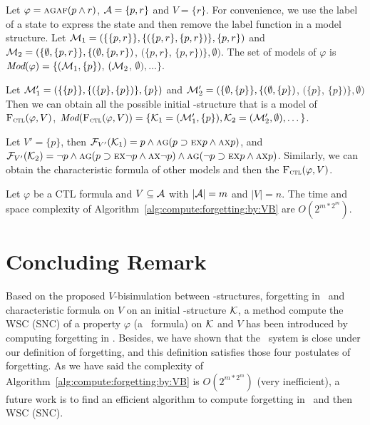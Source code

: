 \documentclass{article}
\begin{document}
\begin{example}
Let $\varphi=\textsc{a}\textsc{g} \textsc{a}\textsc{f} (p \wedge r)$, ${\cal A}=\{p,r\}$ and $V=\{r\}$. For convenience, we use the label of a state to express the state and then remove the label function in a model structure.
Let ${\cal M}_1=(\{\{p,r\}\}, \{(\{p,r\}, \{p,r\})\}, \{p,r\})$ and ${\cal M}_2=(\{\emptyset,\{p,r\}\}, \{(\emptyset, \{p,r\})$, $(\{p,r\}$, $\{p,r\})\}, \emptyset)$.
The set of models of $\varphi$ is $\textit{Mod}(\varphi)=\{({\cal M}_1, \{p\})$, $({\cal M}_2$, $\emptyset), \dots\}$.

Let ${\cal M}_1'=(\{\{p\}\}, \{(\{p\}, \{p\})\}, \{p\})$ and ${\cal M}_2'=(\{\emptyset,\{p\}\}, \{(\emptyset, \{p\})$, $(\{p\}$, $\{p\})\}, \emptyset)$
  Then we can obtain all the possible initial \MPK-structure that is a model of ${\textsc{F}_{\textsc{ctl}}}(\varphi, V)$, \ie $\textit{Mod}({\textsc{F}_{\textsc{ctl}}}(\varphi, V)) =\{{\cal K}_1=({\cal M}_1', \{p\}), {\cal K}_2=({\cal M}_2', \emptyset), \dots\}$.

Let $V'=\{p\}$, then
 ${\cal F}_{V'}({\cal K}_1)= p \wedge \textsc{a}\textsc{g} (p\supset \textsc{e} \textsc{x} p \wedge \textsc{a} \textsc{x} p)$,
 and
 ${\cal F}_{V'}({\cal K}_2)=\neg p\wedge \textsc{a}\textsc{g} (p\supset \textsc{e} \textsc{x} \neg p \wedge \textsc{a} \textsc{x} \neg p) \wedge \textsc{a}\textsc{g} (\neg p\supset \textsc{e} \textsc{x} p \wedge \textsc{a} \textsc{x} p)$. Similarly, we can obtain the characteristic formula of other models and then the ${\textsc{F}_{\textsc{ctl}}}(\varphi, V)$.%
\end{example}

\begin{proposition}\label{pro:time:alg1}
 Let $\varphi$ be a CTL formula and $V\subseteq {\cal A}$ with $|{\cal A}|=m$ and $|V|=n$. The time and space complexity of
Algorithm~\ref{alg:compute:forgetting:by:VB} are $O(2^{m*2^m})$.%
\end{proposition}

\section{Concluding Remark}
Based on the proposed $V$-bisimulation between \MPK-structures,  forgetting in \CTL\ and characteristic formula on $V$ on an initial \MPK-structure $\cal K$,
a method compute the WSC (SNC) of a property $\varphi$ (a \CTL\ formula) on $\cal K$ and $V$ has been introduced by computing forgetting in \CTL.
Besides, we have shown that the \CTL\ system is close under
our definition of forgetting, and this definition satisfies those four postulates of forgetting.
As we have said the complexity of Algorithm~\ref{alg:compute:forgetting:by:VB} is $O(2^{m*2^m})$ (very inefficient), a future
work is to find an efficient algorithm to compute forgetting in \CTL\ and then WSC (SNC).
\end{document}
